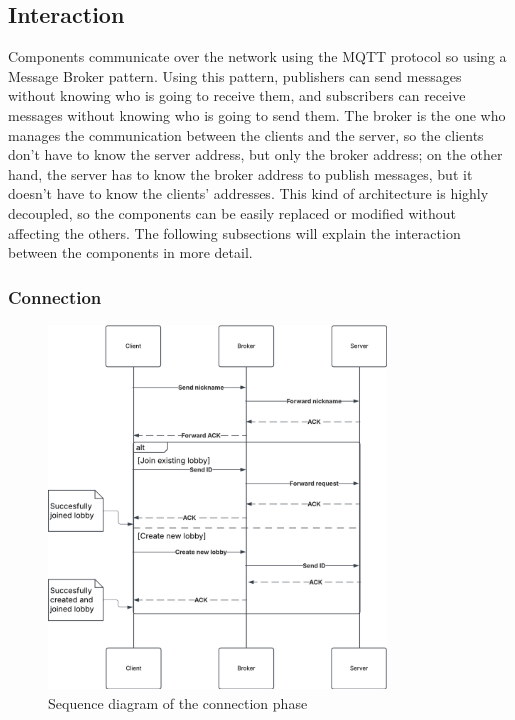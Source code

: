 \documentclass{scrartcl}
\begin{document}
\subsection{Interaction}\label{interaction}

Components communicate over the network using the MQTT protocol so using a Message Broker pattern. Using this pattern, publishers can send messages without knowing who is going to receive them, and subscribers can receive messages without knowing who is going to send them.
The broker is the one who manages the communication between the clients and the server, so the clients don't have to know the server address, but only the broker address; on the other hand, the server has to know the broker address to publish messages, but it doesn't have to know the clients' addresses. \newline
This kind of architecture is highly decoupled, so the components can be easily replaced or modified without affecting the others. \newline
The following subsections will explain the interaction between the components in more detail.

\subsubsection{Connection}\label{connection}
\begin{figure}[H]
      \centering
      \includegraphics[width=0.8\textwidth]{figures/sequenceConnection.png}
      \caption{Sequence diagram of the connection phase}
      \label{fig:connection}
\end{figure}
\end{document}
